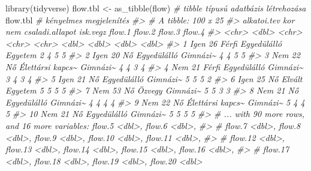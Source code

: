 \documentclass[
]{book}
\newenvironment{Shaded}{\begin{snugshade}}{\end{snugshade}}
\newcommand{\CommentTok}[1]{\textcolor[rgb]{0.56,0.35,0.01}{\textit{#1}}}
\newcommand{\FunctionTok}[1]{\textcolor[rgb]{0.00,0.00,0.00}{#1}}
\newcommand{\NormalTok}[1]{#1}
\newcommand{\OtherTok}[1]{\textcolor[rgb]{0.56,0.35,0.01}{#1}}
\begin{document}
\begin{Shaded}
\begin{Highlighting}[]
\FunctionTok{library}\NormalTok{(tidyverse)}
\NormalTok{flow.tbl }\OtherTok{\textless{}{-}} \FunctionTok{as\_tibble}\NormalTok{(flow) }\CommentTok{\# tibble típusú adatbázis létrehozása}
\NormalTok{flow.tbl                    }\CommentTok{\# kényelmes megjelenítés}
\CommentTok{\#\textgreater{} \# A tibble: 100 x 25}
\CommentTok{\#\textgreater{}    alkatoi.tev   kor nem   csaladi.allapot  isk.vegz flow.1 flow.2 flow.3 flow.4}
\CommentTok{\#\textgreater{}    \textless{}chr\textgreater{}       \textless{}dbl\textgreater{} \textless{}chr\textgreater{} \textless{}chr\textgreater{}            \textless{}chr\textgreater{}     \textless{}dbl\textgreater{}  \textless{}dbl\textgreater{}  \textless{}dbl\textgreater{}  \textless{}dbl\textgreater{}}
\CommentTok{\#\textgreater{}  1 Igen           26 Férfi Egyedülálló      Egyetem       2      4      5      5}
\CommentTok{\#\textgreater{}  2 Igen           20 Nő    Egyedülálló      Gimnázi\textasciitilde{}      4      4      5      5}
\CommentTok{\#\textgreater{}  3 Nem            22 Nő    Élettársi kapcs\textasciitilde{} Gimnázi\textasciitilde{}      4      4      3      4}
\CommentTok{\#\textgreater{}  4 Nem            21 Férfi Egyedülálló      Gimnázi\textasciitilde{}      3      4      3      4}
\CommentTok{\#\textgreater{}  5 Igen           21 Nő    Egyedülálló      Gimnázi\textasciitilde{}      5      5      5      2}
\CommentTok{\#\textgreater{}  6 Igen           25 Nő    Elvált           Egyetem       5      5      5      5}
\CommentTok{\#\textgreater{}  7 Nem            53 Nő    Özvegy           Gimnázi\textasciitilde{}      5      5      3      3}
\CommentTok{\#\textgreater{}  8 Nem            21 Nő    Egyedülálló      Gimnázi\textasciitilde{}      4      4      4      4}
\CommentTok{\#\textgreater{}  9 Nem            22 Nő    Élettársi kapcs\textasciitilde{} Gimnázi\textasciitilde{}      5      4      4      5}
\CommentTok{\#\textgreater{} 10 Nem            21 Nő    Egyedülálló      Gimnázi\textasciitilde{}      5      5      5      5}
\CommentTok{\#\textgreater{} \# ... with 90 more rows, and 16 more variables: flow.5 \textless{}dbl\textgreater{}, flow.6 \textless{}dbl\textgreater{},}
\CommentTok{\#\textgreater{} \#   flow.7 \textless{}dbl\textgreater{}, flow.8 \textless{}dbl\textgreater{}, flow.9 \textless{}dbl\textgreater{}, flow.10 \textless{}dbl\textgreater{}, flow.11 \textless{}dbl\textgreater{},}
\CommentTok{\#\textgreater{} \#   flow.12 \textless{}dbl\textgreater{}, flow.13 \textless{}dbl\textgreater{}, flow.14 \textless{}dbl\textgreater{}, flow.15 \textless{}dbl\textgreater{}, flow.16 \textless{}dbl\textgreater{},}
\CommentTok{\#\textgreater{} \#   flow.17 \textless{}dbl\textgreater{}, flow.18 \textless{}dbl\textgreater{}, flow.19 \textless{}dbl\textgreater{}, flow.20 \textless{}dbl\textgreater{}}
\end{Highlighting}
\end{Shaded}
\end{document}
